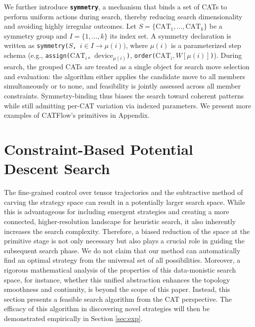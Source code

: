 \documentclass[letterpaper,twocolumn,10pt]{article}
\newcommand{\name}{CATFlow}
\begin{document}

We further introduce \textbf{\texttt{symmetry}}, a mechanism that binds a set of CATs to perform uniform actions during search, thereby reducing search dimensionality and avoiding highly irregular outcomes. Let $S=\{\text{CAT}_1,\ldots,\text{CAT}_k\}$ be a symmetry group and $I=\{1,\ldots,k\}$ its index set. A symmetry declaration is written as \texttt{symmetry($S$, ${i\in I \to \mu(i))}$}, where $\mu(i)$ is a parameterized step schema (e.g., \texttt{assign($\text{CAT}_i$, $\text{device}_{\mu(i)}$)}, \texttt{order($\text{CAT}_i, W[\mu(i)]$)}). During search, the grouped CATs are treated as a single object for search move selection and evaluation: the algorithm either applies the candidate move to all members simultaneously or to none, and feasibility is jointly assessed across all member constraints. Symmetry-binding thus biases the search toward coherent patterns while still admitting per-CAT variation via indexed parameters.
We present more examples of \name{}'s primitives in Appendix.

\section{Constraint-Based Potential Descent Search}
\label{sec:search}


The fine-grained control over tensor trajectories and the subtractive method of carving the strategy space can result in a potentially larger search space. While this is advantageous for including emergent strategies and creating a more connected, higher-resolution landscape for heuristic search, it also inherently increases the search complexity. Therefore, a biased reduction of the space at the primitive stage is not only necessary but also plays a crucial role in guiding the subsequent search phase. We do not claim that our method can automatically find an optimal strategy from the universal set of all possibilities. Moreover, a rigorous mathematical analysis of the properties of this data-monistic search space, for instance, whether this unified abstraction enhances the topology smoothness and continuity, is beyond the scope of this paper. Instead, this section presents a feasible search algorithm from the CAT perspective. The efficacy of this algorithm in discovering novel strategies will then be demonstrated empirically in Section \ref{sec:exp}.
\end{document}
